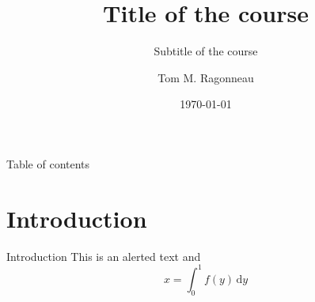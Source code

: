 \documentclass{ragonneau-beamer}
\title{Title of the course}
\subtitle{Subtitle of the course}
\date{\today}
\author{Tom M. Ragonneau}
\institute{
    Department of Applied Mathematics\\ 
    The Hong Kong Polytechnic University
}
\begin{document}
\maketitle

\begin{frame}{Table of contents}
    \tableofcontents[hideallsubsections]
\end{frame}

\section{Introduction}

\begin{frame}{Introduction} 
    This is an \alert{alerted text} and
    \begin{equation}
        x = \int_0^1 f(y) \, \mathrm{d}y
    \end{equation}
\end{frame}

\appendix
\end{document}
